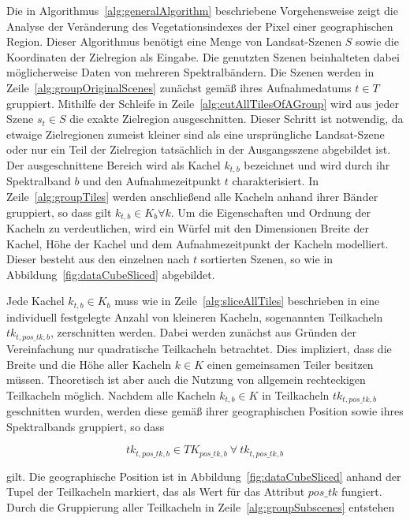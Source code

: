 Die in Algorithmus~\ref{alg:generalAlgorithm} beschriebene Vorgehensweise zeigt die Analyse der Veränderung des Vegetationsindexes der Pixel einer geographischen Region. Dieser Algorithmus benötigt eine Menge von Landsat-Szenen $S$ sowie die Koordinaten der Zielregion als Eingabe. Die genutzten Szenen beinhalteten dabei möglicherweise Daten von mehreren Spektralbändern. Die Szenen werden in Zeile~\ref{alg:groupOriginalScenes} zunächst gemäß ihres Aufnahmedatums $t \in T$ gruppiert. Mithilfe der Schleife in Zeile~\ref{alg:cutAllTilesOfAGroup} wird aus jeder Szene $s_t \in S$ die exakte Zielregion ausgeschnitten. Dieser Schritt ist notwendig, da etwaige Zielregionen zumeist kleiner sind als eine ursprüngliche Landsat-Szene oder nur ein Teil der Zielregion tatsächlich in der Ausgangsszene abgebildet ist. Der ausgeschnittene Bereich wird als Kachel $k_{t, b}$ bezeichnet und wird durch ihr Spektralband $b$ und den Aufnahmezeitpunkt $t$ charakterisiert. In Zeile~\ref{alg:groupTiles} werden anschließend alle Kacheln anhand ihrer Bänder gruppiert, so dass gilt $k_{t, b} \in K_{b} \forall k$. Um die Eigenschaften und Ordnung der Kacheln zu verdeutlichen, wird ein Würfel mit den Dimensionen Breite der Kachel, Höhe der Kachel und dem Aufnahmezeitpunkt der Kacheln modelliert. Dieser besteht aus den einzelnen nach $t$ sortierten Szenen, so wie in Abbildung~\ref{fig:dataCubeSliced} abgebildet. 

Jede Kachel $k_{t, b} \in K_{b}$ muss wie in Zeile~\ref{alg:sliceAllTiles} beschrieben in eine individuell festgelegte Anzahl von kleineren Kacheln, sogenannten Teilkacheln $tk_{t, pos\_tk, b}$, zerschnitten werden. Dabei werden zunächst aus Gründen der Vereinfachung nur quadratische Teilkacheln betrachtet. Dies impliziert, dass die Breite und die Höhe aller Kacheln $k \in K$ einen gemeinsamen Teiler besitzen müssen. Theoretisch ist aber auch die Nutzung von allgemein rechteckigen Teilkacheln möglich. Nachdem alle Kacheln $k_{t, b} \in K$ in Teilkacheln $tk_{t, pos\_tk, b}$ geschnitten wurden, werden diese gemäß ihrer geographischen Position sowie ihres Spektralbands gruppiert, so dass 

\begin{equation} \label{eq:numberOfSubsceneGroups}
tk_{t, pos\_tk, b} \in TK_{pos\_tk, b}\ \forall\ tk_{t, pos\_tk, b}
\end{equation}

 gilt. Die geographische Position ist in Abbildung~\ref{fig:dataCubeSliced} anhand der Tupel der Teilkacheln markiert, das als Wert für das Attribut $pos\_tk$ fungiert. Durch die Gruppierung aller Teilkacheln in Zeile~\ref{alg:groupSubscenes} entstehen 

